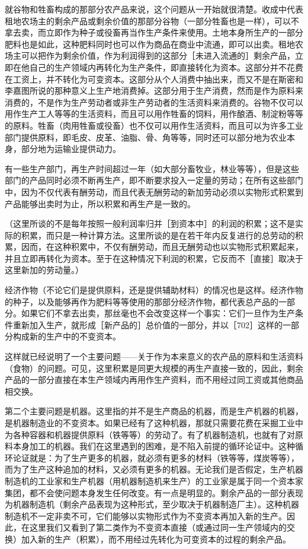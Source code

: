 就谷物和牲畜构成的那部分农产品来说，这个问题从一开始就很清楚。收成中代表租地农场主的剩余产品或剩余价值的那部分谷物（一部分牲畜也是一样），可以不拿去卖，而立即作为种子或役畜再当作生产条件来使用。土地本身所生产的一部分肥料也是如此，这种肥料同时也可以作为商品在商业中流通，即可以出卖。租地农场主可以把作为剩余价值，作为利润得到的这部分［未进入流通的］剩余产品，立即在他自己的生产领域内再转化为生产条件，即直接转化为资本。这部分并不花费在工资上，并不转化为可变资本。这部分从个人消费中抽出来，而又不是在斯密和李嘉图所说的那种意义上生产地消费掉。这部分用于生产消费，然而是作为原料来消费的，不是作为生产劳动者或非生产劳动者的生活资料来消费的。谷物不仅可以用作生产工人等等的生活资料，而且可以用作牲畜的饲料，用作酿酒、制淀粉等等的原料。牲畜（肉用牲畜或役畜）也不仅可以用作生活资料，而且可以为许多工业部门提供原料，即毛皮、皮革、油脂、骨、角等等，同时还可以部分地为农业本身，部分地为运输业提供动力。

有一些生产部门，再生产时间超过一年（如大部分畜牧业，林业等等），但是这些部门的产品同时必须不断再生产，即不断要求投入一定量的劳动；在所有这些部门中，因为不仅代表有酬劳动，而且代表无酬劳动的新加劳动必须以实物形式积累到产品能够出卖时为止，所以积累和再生产是一致的。

（这里所谈的不是每年按照一般利润率归并［到资本中］的利润的积累；这不是实际的积累，而只是一种计算方法。这里所谈的是在若干年内反复进行的总劳动的积累，因而，在这种积累中，不仅有酬劳动，而且无酬劳动也以实物形式积累起来，并且立即再转化为资本。至于在这种情况下利润的积累，它反而不［直接］取决于这里新加的劳动量。）

经济作物（不论它们是提供原料，还是提供辅助材料）的情况也是这样。经济作物的种子，以及能够再作为肥料等等使用的那部分经济作物，都代表总产品的一部分。如果它们不拿去出卖，那丝毫也不会改变这样一个事实：它们一旦作为生产条件重新加入生产，就形成［新产品的］总价值的一部分，并以［702］这样的一部分构成新的生产中的不变资本。

这样就已经说明了一个主要问题——关于作为本来意义的农产品的原料和生活资料（食物）的问题。可见，这里积累是同更大规模的再生产直接一致的，因此，剩余产品的一部分直接在本生产领域内再用作生产资料，而不用经过同工资或其他商品相交换。

第二个主要问题是机器。这里指的并不是生产商品的机器，而是生产机器的机器，是机器制造业的不变资本。如果已经有了这种机器，那就只需要花费在采掘工业中为各种容器和机器提供原料（铁等等）的劳动了。有了机器制造机，也就有了对原料本身加工的机器。我们在这里遇到的困难，是不陷入前提的循环论证中。这种循环论证就是：为了生产更多的机器，就必须有更多的材料（铁等等，煤炭等等），而为了生产这种追加的材料，又必须有更多的机器。无论我们是否假定，生产机器制造机的工业家和生产机器（用机器制造机来生产）的工业家是属于同一个资本家集团，都不会使问题本身发生任何改变。有一点是明显的。剩余产品的一部分表现为机器制造机（剩余产品表现为这种形式，至少取决于机器制造厂主）。这种机器制造机不一定非卖不可，它们能够以实物形式作为不变资本再加入新的生产。因此，在这里我们又看到了第二类作为不变资本直接（或通过同一生产领域内的交换）加入新的生产（积累），而不用经过先转化为可变资本的过程的剩余产品。

